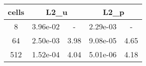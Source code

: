 \documentclass[10pt]{report}
\begin{document}
\begin{table}[H]
\begin{center}
\begin{tabular}{|c|c|c|c|c|} \hline
cells & 
\multicolumn{2}{|c|}{L2_u} & 
\multicolumn{2}{|c|}{L2_p}\\ \hline
8 & 3.96e-02 & - & 2.29e-03 & -\\ \hline
64 & 2.50e-03 & 3.98 & 9.08e-05 & 4.65\\ \hline
512 & 1.52e-04 & 4.04 & 5.01e-06 & 4.18\\ \hline
\end{tabular}
\end{center}
\end{table}
\end{document}

